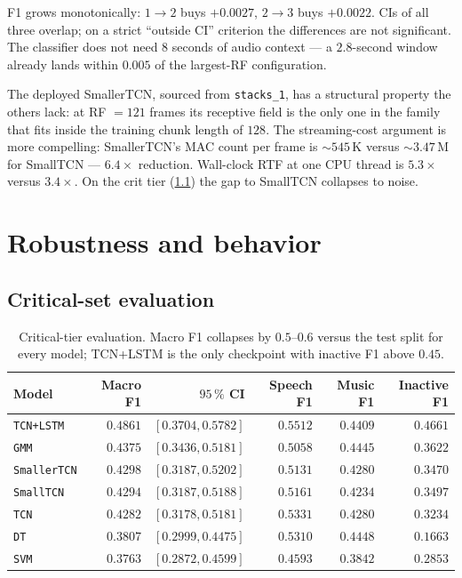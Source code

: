 F1 grows monotonically: $1 \to 2$ buys $+0.0027$, $2 \to 3$ buys $+0.0022$.
CIs of all three overlap; on a strict ``outside CI'' criterion the differences are not significant.
The classifier does not need $8$ seconds of audio context — a $2.8$-second window already lands within $0.005$ of the largest-RF configuration.

The deployed SmallerTCN, sourced from \texttt{stacks\_1}, has a structural property the others lack: at RF $= 121$ frames its receptive field is the only one in the family that fits inside the training chunk length of $128$.
The streaming-cost argument is more compelling: SmallerTCN's MAC count per frame is $\sim 545$\,K versus $\sim 3.47$\,M for SmallTCN — $6.4\times$ reduction.
Wall-clock RTF at one CPU thread is $5.3\times$ versus $3.4\times$.
On the crit tier (\cref{sec:exp_critical_results}) the gap to SmallTCN collapses to noise.

\section{Robustness and behavior}
\label{sec:exp_robustness}

\subsection{Critical-set evaluation}
\label{sec:exp_critical_results}

\begin{table}[h]
\centering
\begin{tabular}{lrrrrr}
\toprule
\textbf{Model} & \textbf{Macro F1} & \textbf{$95\,\%$ CI} & \textbf{Speech F1} & \textbf{Music F1} & \textbf{Inactive F1} \\
\midrule
\texttt{TCN+LSTM}   & $\mathbf{0.4861}$ & $[0.3704, 0.5782]$ & $0.5512$ & $0.4409$ & $\mathbf{0.4661}$ \\
\texttt{GMM}        & $0.4375$          & $[0.3436, 0.5181]$ & $0.5058$ & $0.4445$ & $0.3622$ \\
\texttt{SmallerTCN} & $0.4298$          & $[0.3187, 0.5202]$ & $0.5131$ & $0.4280$ & $0.3470$ \\
\texttt{SmallTCN}   & $0.4294$          & $[0.3187, 0.5188]$ & $0.5161$ & $0.4234$ & $0.3497$ \\
\texttt{TCN}        & $0.4282$          & $[0.3178, 0.5181]$ & $0.5331$ & $0.4280$ & $0.3234$ \\
\texttt{DT}         & $0.3807$          & $[0.2999, 0.4475]$ & $0.5310$ & $0.4448$ & $0.1663$ \\
\texttt{SVM}        & $0.3763$          & $[0.2872, 0.4599]$ & $0.4593$ & $0.3842$ & $0.2853$ \\
\bottomrule
\end{tabular}
\caption{Critical-tier evaluation. Macro F1 collapses by $0.5$--$0.6$ versus the test split for every model; TCN+LSTM is the only checkpoint with inactive F1 above $0.45$.}
\label{tab:critical_results}
\end{table}

